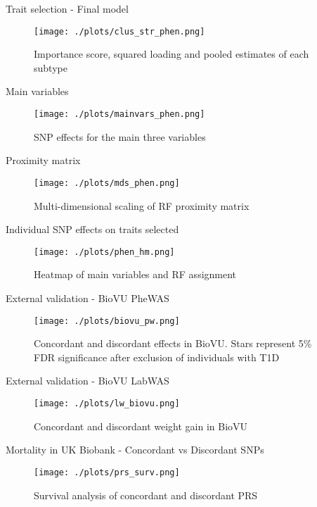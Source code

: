 \documentclass[presentation]{beamer}
\begin{document}
\begin{frame}[label={sec:org3ce0a02}]{Trait selection - Final model}
\begin{figure}[htbp]
\centering
\texttt{[image: ./plots/clus\_str\_phen.png]}
\caption{Importance score, squared loading and pooled estimates of each subtype}
\end{figure}
\end{frame}
\begin{frame}[label={sec:org1c2c9e5}]{Main variables}
\begin{figure}[htbp]
\centering
\texttt{[image: ./plots/mainvars\_phen.png]}
\caption{SNP effects for the main three variables}
\end{figure}
\end{frame}
\begin{frame}[label={sec:org8d9ea80}]{Proximity matrix}
\begin{figure}[htbp]
\centering
\texttt{[image: ./plots/mds\_phen.png]}
\caption{Multi-dimensional scaling of RF proximity matrix}
\end{figure}
\end{frame}
\begin{frame}[label={sec:org397379c}]{Individual SNP effects on traits selected}
\begin{figure}[htbp]
\centering
\texttt{[image: ./plots/phen\_hm.png]}
\caption{Heatmap of main variables and RF assignment}
\end{figure}
\end{frame}
\begin{frame}[label={sec:org08fd5e3}]{External validation - BioVU PheWAS}
\begin{figure}[htbp]
\centering
\texttt{[image: ./plots/biovu\_pw.png]}
\caption{Concordant and discordant effects in BioVU. Stars represent 5\% FDR significance after exclusion of individuals with T1D}
\end{figure}
\end{frame}
\begin{frame}[label={sec:org02abdfb}]{External validation - BioVU LabWAS}
\begin{figure}[htbp]
\centering
\texttt{[image: ./plots/lw\_biovu.png]}
\caption{Concordant and discordant weight gain in BioVU}
\end{figure}
\end{frame}
\begin{frame}[label={sec:org7a6dacc}]{Mortality in UK Biobank - Concordant vs Discordant SNPs}
\begin{figure}[htbp]
\centering
\texttt{[image: ./plots/prs\_surv.png]}
\caption{Survival analysis of concordant and discordant PRS}
\end{figure}
\end{frame}
\end{document}
